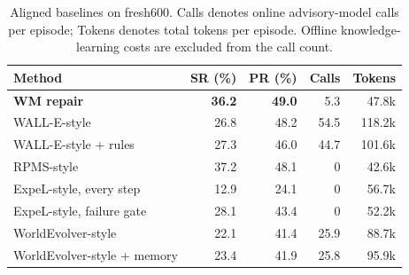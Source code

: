 \begin{table}[tbp]
\caption{Aligned baselines on fresh600. Calls denotes online advisory-model calls per episode; Tokens denotes total tokens per episode. Offline knowledge-learning costs are excluded from the call count.}
\label{tab:baselines}\centering
\begin{tabular}{lrrrr}\toprule
Method & SR (\%) & PR (\%) & Calls & Tokens\\\midrule
\textbf{WM repair} & \textbf{36.2} & \textbf{49.0} & 5.3 & 47.8k\\
WALL-E-style & 26.8 & 48.2 & 54.5 & 118.2k\\
WALL-E-style + rules & 27.3 & 46.0 & 44.7 & 101.6k\\
RPMS-style & 37.2 & 48.1 & 0 & 42.6k\\
ExpeL-style, every step & 12.9 & 24.1 & 0 & 56.7k\\
ExpeL-style, failure gate & 28.1 & 43.4 & 0 & 52.2k\\
WorldEvolver-style & 22.1 & 41.4 & 25.9 & 88.7k\\
WorldEvolver-style + memory & 23.4 & 41.9 & 25.8 & 95.9k\\\bottomrule
\end{tabular}
\end{table}
